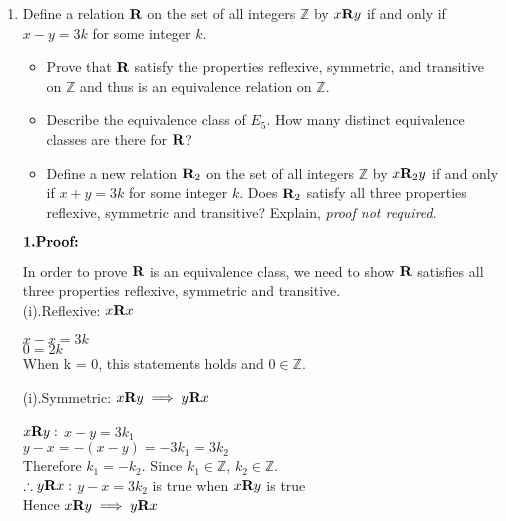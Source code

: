 \documentclass{article}
\begin{document}
\begin{enumerate}
\bigskip
\item Define a relation $\text{\bf R}$ on the set of all integers $\mathbb{Z}$ by $x \text{\bf R} y $ if and only if $x - y = 3k$ for some integer $k$.  \begin{itemize}
\item Prove that $\text{\bf R}$ satisfy the properties reflexive, symmetric, and transitive on $\mathbb{Z}$ and thus is an equivalence relation on $\mathbb{Z}$.
\item Describe the equivalence class of $E_5$. How many distinct equivalence classes are there for $\text{\bf R}$?
\item Define a new relation $\text{\bf R}_2$ on the set of all integers $\mathbb{Z}$ by $x \text{\bf R}_2 y $ if and only if $x + y = 3k$ for some integer $k$.  Does $\text{\bf R}_2$ satisfy all three properties reflexive, symmetric and transitive? Explain, {\it proof not required}.
\end{itemize}
\bigskip
\vspace{.15in}

$\text{\bf 1.Proof:}$
	\begin{addmargin}[1.5cm]{0cm}
		In order to prove $\text{\bf R}$ is an equivalence class, we need to show $\text{\bf R}$ satisfies all three properties reflexive, symmetric and transitive.\\
		(i).Reflexive: $x \text{\bf R} x$
		\begin{addmargin}[0.5cm]{0cm}
			$x - x = 3k$\\
			$0 = 2k$\\
			When k = 0, this statements holds and $0 \in \mathbb{Z}$.
		\end{addmargin}
	\end{addmargin}
	
	\begin{addmargin}[1.5cm]{0cm}
		(i).Symmetric: $x \text{\bf R} y \implies y \text{\bf R} x$
		\begin{addmargin}[0.5cm]{0cm}
			$x \text{\bf R} y:$ $x - y = 3k_1$\\
			$y - x = - (x - y) = -3k_1 = 3k_2$\\
			Therefore $k_1 = -k_2$. Since $k_1 \in \mathbb{Z}$, $k_2 \in \mathbb{Z}.$\\
			$\therefore y \text{\bf R} x:$ $y - x = 3k_2$ is true when $x \text{\bf R} y$ is true\\
			Hence $x \text{\bf R} y \implies y \text{\bf R} x$\\ 
		\end{addmargin}
	\end{addmargin}
	

\end{enumerate}
\end{document}
